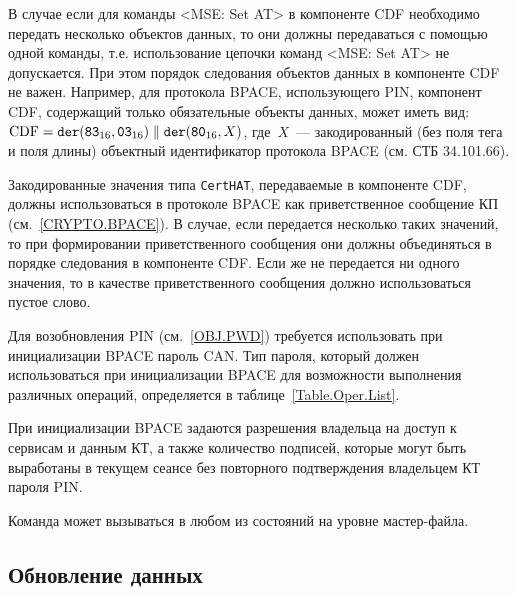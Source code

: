 В случае если для команды <MSE: Set AT> в компоненте CDF необходимо 
передать несколько объектов данных, то они должны передаваться с помощью 
одной команды, т.е. использование цепочки команд <MSE: Set AT> не 
допускается. При этом порядок следования объектов данных в компоненте CDF 
не важен. Например, для протокола BPACE, использующего PIN, компонент CDF, 
содержащий только обязательные объекты данных, может иметь вид: 
$\text{CDF} = 
\texttt{der}(\texttt{83}_{16}, \texttt{03}_{16}) \parallel 
\texttt{der}(\texttt{80}_{16}, X)$, где~$X$~--- закодированный (без поля тега и 
поля длины) объектный идентификатор протокола BPACE (см. СТБ 34.101.66).

Закодированные значения типа \verb|CertHAT|, передаваемые в компоненте CDF, 
должны использоваться в протоколе BPACE как приветственное сообщение КП
(см.~\ref{CRYPTO.BPACE}).
В случае, если передается несколько таких значений,
то при формировании приветственного сообщения они 
должны объединяться в порядке следования в компоненте CDF.
Если же не передается ни одного значения, то в качестве 
приветственного сообщения должно использоваться пустое слово. 
 

Для возобновления PIN (см.~\ref{OBJ.PWD}) требуется 
использовать при инициализации BPACE пароль CAN. 
Тип пароля, который должен использоваться при 
инициализации BPACE для возможности выполнения различных 
операций, определяется в таблице~\ref{Table.Oper.List}.

При инициализации BPACE задаются разрешения 
владельца на доступ к сервисам и данным  
КТ, а также количество подписей, которые могут быть выработаны 
в текущем сеансе без повторного подтверждения владельцем КТ пароля PIN.

Команда может вызываться в любом из состояний на уровне мастер-файла.


\subsection{Обновление данных}
\label{Oper.Descr.Update}

